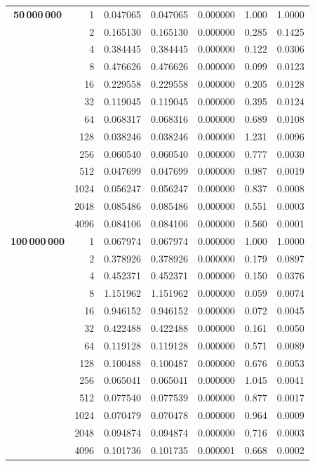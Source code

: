 \documentclass[a4paper,11pt]{article}
\begin{document}
\begin{center}
\begin{longtable}{crccccc}
    \textbf{50\,000\,000} 
    & 1    & 0.047065 & 0.047065 & 0.000000 & 1.000 & 1.0000 \\
    & 2    & 0.165130 & 0.165130 & 0.000000 & 0.285 & 0.1425 \\
    & 4    & 0.384445 & 0.384445 & 0.000000 & 0.122 & 0.0306 \\
    & 8    & 0.476626 & 0.476626 & 0.000000 & 0.099 & 0.0123 \\
    & 16   & 0.229558 & 0.229558 & 0.000000 & 0.205 & 0.0128 \\
    & 32   & 0.119045 & 0.119045 & 0.000000 & 0.395 & 0.0124 \\
    & 64   & 0.068317 & 0.068316 & 0.000000 & 0.689 & 0.0108 \\
    & 128  & 0.038246 & 0.038246 & 0.000000 & 1.231 & 0.0096 \\
    & 256  & 0.060540 & 0.060540 & 0.000000 & 0.777 & 0.0030 \\
    & 512  & 0.047699 & 0.047699 & 0.000000 & 0.987 & 0.0019 \\
    & 1024 & 0.056247 & 0.056247 & 0.000000 & 0.837 & 0.0008 \\
    & 2048 & 0.085486 & 0.085486 & 0.000000 & 0.551 & 0.0003 \\
    & 4096 & 0.084106 & 0.084106 & 0.000000 & 0.560 & 0.0001 \\
    \midrule
    
    \textbf{100\,000\,000} 
    & 1    & 0.067974 & 0.067974 & 0.000000 & 1.000 & 1.0000 \\
    & 2    & 0.378926 & 0.378926 & 0.000000 & 0.179 & 0.0897 \\
    & 4    & 0.452371 & 0.452371 & 0.000000 & 0.150 & 0.0376 \\
    & 8    & 1.151962 & 1.151962 & 0.000000 & 0.059 & 0.0074 \\
    & 16   & 0.946152 & 0.946152 & 0.000000 & 0.072 & 0.0045 \\
    & 32   & 0.422488 & 0.422488 & 0.000000 & 0.161 & 0.0050 \\
    & 64   & 0.119128 & 0.119128 & 0.000000 & 0.571 & 0.0089 \\
    & 128  & 0.100488 & 0.100487 & 0.000000 & 0.676 & 0.0053 \\
    & 256  & 0.065041 & 0.065041 & 0.000000 & 1.045 & 0.0041 \\
    & 512  & 0.077540 & 0.077539 & 0.000000 & 0.877 & 0.0017 \\
    & 1024 & 0.070479 & 0.070478 & 0.000000 & 0.964 & 0.0009 \\
    & 2048 & 0.094874 & 0.094874 & 0.000000 & 0.716 & 0.0003 \\
    & 4096 & 0.101736 & 0.101735 & 0.000001 & 0.668 & 0.0002 \\
    \midrule
    

\end{longtable}
\end{center}
\end{document}
